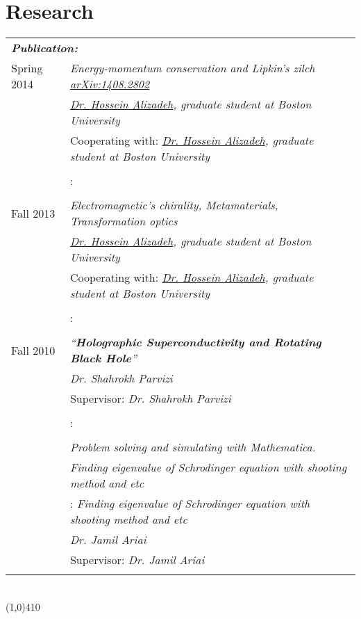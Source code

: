 \documentclass[10pt]{article}
\newcommand\HRule{\hspace*{.8cm}\line(1,0){410}\\}
\newenvironment{Record}[1]
{
    \vspace{-0.35cm}
    \section*{#1}
        \vspace{-0.1cm}
        \begin{tabular}
}
{
        \end{tabular}\\
        \HRule
}
\begin{document}
\newcommand{\Research}[7]{
    \multicolumn{2}{l}{\textbf{\textsl{ #1:}}}\\
    \quad#2&\textit{#3}\\
    \ifthenelse{\isempty{#4}}
    {&\textit{#5}\\}
    {&#4: \textit{#5}\\}
    \ifthenelse{\isempty{#6}}
    {&\textit{#7}\\}
    {&#6: \textit{#7}\\}%
}

\begin{Record}{Research}{l l}
    \Research{Publication}
        {Spring 2014}
        {Energy-momentum conservation and Lipkin’s zilch \href{http://arxiv.org/abs/1408.2802}{arXiv:1408.2802}}
        {Cooperating with}
        {\href{http://physics.bu.edu/people/show/halizade}{Dr. Hossein Alizadeh}, graduate student at Boston University}
        {}{}%
    \Research{Independent Research}
        {Fall 2013}
        {Electromagnetic's chirality, Metamaterials, Transformation optics}
        {Cooperating with}
        {\href{http://physics.bu.edu/people/show/halizade}{Dr. Hossein Alizadeh}, graduate student at Boston University}
        {}{}%
    \Research{M.Sc thesis}
        {Fall 2010}
        {``\textbf{Holographic Superconductivity and Rotating Black Hole}''}
        {Supervisor}
        {Dr. Shahrokh Parvizi}
        {}{}%
    \Research{B.Sc projects}
        {}
        {Problem solving and simulating with Mathematica.}
        {}
        {Finding eigenvalue of Schrodinger equation with shooting method and etc}
        {Supervisor}
        {Dr. Jamil Ariai}%

\end{Record}


\newcommand{\WorkExperience}[7]{
    \multicolumn{3}{l}{\textbf{\textsl{ #1}}}\\
    \quad#2&%
        \ifthenelse{\equal{#3}{Teacher}}
            {%
                \textit{Responsibility:} #3\\
                &\textit{Courses Taught:} #4}
            {}%
        \ifthenelse{\equal{#3}{Open Source}}
            {%
                #3\\
                &\textit{Implemented by:} #4. \textit{Source:} #5\\
                &\textit{Implemented by:} #6. \textit{Source:} #7}
            {}%
        \ifthenelse{\equal{#3}{Programmer}}
            {%
                \textit{Responsibility:} #3\\
                &\textit{Languages:} \texttt{#4}\\
                &\textit{Project:} #5\\
                &\textit{Project:} #6
            }
            {}%
            \\
}
\end{document}
